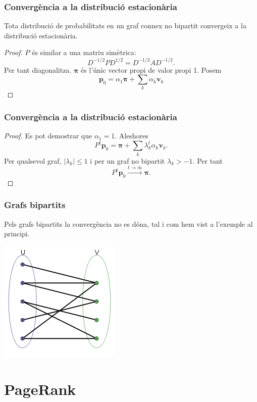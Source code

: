 \documentclass[aspectratio=169, 12pt]{beamer}
\renewcommand{\vec}[1]{\mathbf{\bm #1}}
\newcommand{\abs}[1]{\left\lvert #1 \right\rvert}
\begin{document}
\begin{frame}
	\frametitle{Convergència a la distribució estacionària}
	\begin{theorem}
		Tota distribució de probabilitats en un graf connex no bipartit convergeix a la distribució estacionària. 
	\end{theorem}
	\pause
	\begin{proof}
\( P \) és similar a una matriu simètrica:
\[ D^{-1/2}PD^{1/2} = D^{-1/2}AD^{-1/2}. \] \pause
Per tant diagonalitza. \pause
\( \vec{\pi} \) és l'únic vector propi de valor propi 1. Posem \[ \vec{p}_0 = \alpha_1 \vec{\pi} + \sum_k \alpha_k \vec{v}_k \]
\end{proof}
\end{frame}

\begin{frame}
	\frametitle{Convergència a la distribució estacionària}
	\begin{proof}
		Es pot demostrar que \( \alpha_1 = 1 \). \pause Aleshores
		\begin{equation*}
			P^t \vec{p}_0 = \vec{\pi} + \sum_k \lambda_k^t \alpha_k \vec{v}_k. 
		\end{equation*} \pause
		Per qualsevol graf, \( \abs{\lambda_k} \leq 1 \) i per un graf no bipartit \( \lambda_k > -1 \). \pause Per tant 
		\begin{equation*}
			P^t \vec{p}_0 \xrightarrow{t \to \infty} \vec{\pi}.
		\end{equation*}
	\end{proof}
\end{frame}

\begin{frame}
\frametitle{Grafs bipartits}
Pels grafs bipartits la convergència no es dóna, tal i com hem vist a l'exemple al principi. \pause

\centering
\includegraphics[scale = 0.7]{bipartit.png}
\end{frame}

\section{PageRank}
\end{document}
